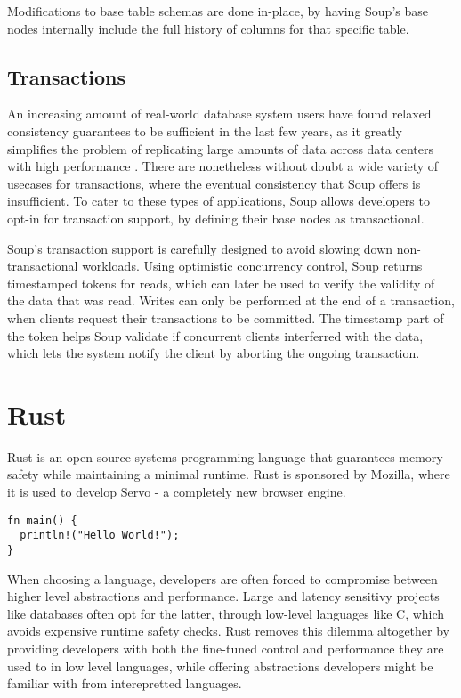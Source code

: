 \documentclass[b5paper]{report}
\begin{document}
Modifications to base table schemas are done in-place, by having Soup's base
nodes internally include the full history of columns for that specific table.

\subsection{Transactions}
An increasing amount of real-world database system users have found relaxed
consistency guarantees to be sufficient in the last few years, as it greatly
simplifies the problem of replicating large amounts of data across data centers
with high performance \cite{existential}. There are nonetheless without doubt
a wide variety of usecases for transactions, where the eventual consistency that
Soup offers is insufficient. To cater to these types of applications, Soup
allows developers to opt-in for transaction support, by defining their base
nodes as transactional.

Soup's transaction support is carefully designed to avoid slowing down
non-transactional workloads. Using optimistic concurrency control, Soup returns
timestamped tokens for reads, which can later be used to verify the validity of
the data that was read. Writes can only be performed at the end of a
transaction, when clients request their transactions to be committed. The
timestamp part of the token helps Soup validate if concurrent clients
interferred with the data, which lets the system notify the client by aborting
the ongoing transaction.

\section{Rust}
Rust \cite{rust} is an open-source systems programming language that guarantees memory
safety while maintaining a minimal runtime. Rust is sponsored by Mozilla, where
it is used to develop Servo - a completely new browser engine.

\begin{lstlisting}[caption="Hello World in Rust"]
fn main() {
  println!("Hello World!");
}
\end{lstlisting}

When choosing a language, developers are often forced to compromise between
higher level abstractions and performance. Large and latency sensitivy projects
like databases often opt for the latter, through low-level languages like C,
which avoids expensive runtime safety checks. Rust removes this dilemma
altogether by providing developers with both the fine-tuned control and
performance they are used to in low level languages, while offering abstractions
developers might be familiar with from interepretted languages.
\end{document}
